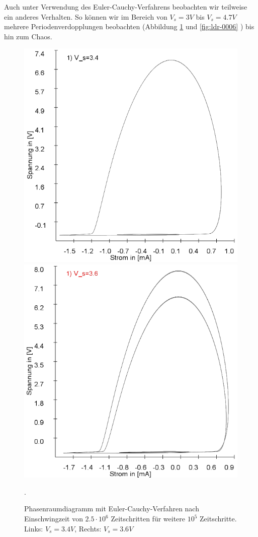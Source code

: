 \documentclass{scrartcl}
\begin{document}
Auch unter Verwendung des Euler-Cauchy-Verfahrens beobachten wir teilweise ein anderes Verhalten. So können wir im Bereich von $V_s=3V$ bis $V_s=4.7V$ mehrere Periodenverdopplungen beobachten (Abbildung \ref{fig:ldr-0005} und \ref{fig:ldr-0006} ) bis hin zum Chaos.
\begin{figure}
\includegraphics[scale=0.42]{schwing-euler-nach2500k-weitere100k-3,4V}
\includegraphics[scale=0.42]{schwing-euler-nach2500k-weitere100k-3,6V}
\caption{Phasenraumdiagramm mit Euler-Cauchy-Verfahren nach Einschwingzeit von $2.5\cdot10^6$ Zeitschritten für weitere $10^5$ Zeitschritte. Links: $V_s=3.4V$, Rechts: $V_s=3.6V$}. 
\label{fig:ldr-0005}
\end{figure}
\end{document}
